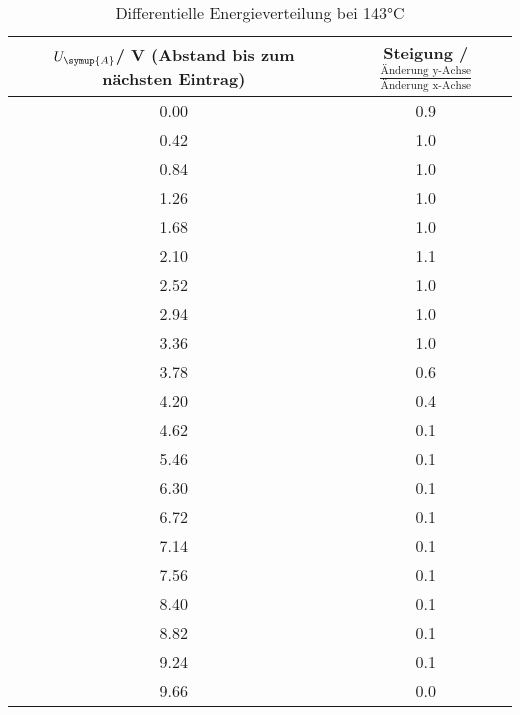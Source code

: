 \begin{table}[!htp]
\centering
\caption{Differentielle Energieverteilung bei 143°C}
\label{tab:messreihe2}
\begin{tabular}{c c}
\toprule
{$U_{\symup{A}}$/ V (Abstand bis zum nächsten Eintrag)} & {Steigung  / $\frac{\text{Änderung y-Achse}}{\text{Änderung x-Achse}}$} \\
\midrule
0.00 & 0.9 \\
0.42 & 1.0 \\
0.84 & 1.0 \\
1.26 & 1.0 \\
1.68 & 1.0 \\
2.10 & 1.1 \\
2.52 & 1.0 \\
2.94 & 1.0 \\
3.36 & 1.0 \\
3.78 & 0.6 \\
4.20 & 0.4 \\
4.62 & 0.1 \\
5.46 & 0.1 \\
6.30 & 0.1 \\
6.72 & 0.1 \\
7.14 & 0.1 \\
7.56 & 0.1 \\
8.40 & 0.1 \\
8.82 & 0.1 \\
9.24 & 0.1 \\
9.66 & 0.0 \\
\bottomrule
\end{tabular}
\end{table}
